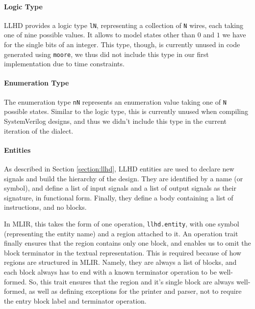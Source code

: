 
\paragraph{Logic Type}
LLHD provides a logic type \texttt{lN}, representing a collection of \texttt{N} wires, each taking one of nine possible values. It allows to model states other than $0$ and $1$ we have for the single bits of an integer. This type, though, is currently unused in code generated using \texttt{moore}, we thus did not include this type in our first implementation due to time constraints.

\paragraph{Enumeration Type}
The enumeration type \texttt{nN} represents an enumeration value taking one of \texttt{N} possible states. Similar to the logic type, this is currently unused when compiling SystemVerilog designs, and thus we didn't include this type in the current iteration of the dialect.

\paragraph{Entities}
As described in Section \ref{section:llhd}, LLHD entities are used to declare new signals and build the hierarchy of the design. They are identified by a name (or symbol), and define a list of input signals and a list of output signals as their signature, in functional form. Finally, they define a body containing a list of instructions, and no blocks.

In MLIR, this takes the form of one operation, \texttt{llhd.entity}, with one symbol (representing the entity name) and a region attached to it. An operation trait finally ensures that the region contains only one block, and enables us to omit the block terminator in the textual representation. This is required because of how regions are structured in MLIR. Namely, they are always a list of blocks, and each block always has to end with a known terminator operation to be well-formed. So, this trait ensures that the region and it's single block are always well-formed, as well as defining exceptions for the printer and parser, not to require the entry block label and terminator operation.

